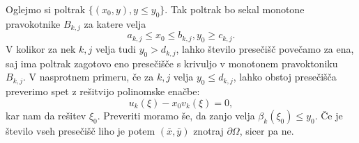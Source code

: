 \documentclass{article}
\begin{document}
Oglejmo si poltrak $\{(x_0,y) , y \leq y_0\}$. Tak poltrak bo sekal monotone pravokotnike $B_{k,j}$ za katere velja 
\begin{equation}
a_{k,j} \leq x_0 \leq b_{k,j} , y_0 \geq c_{k,j}.
\end{equation}
V kolikor za nek $k,j$ velja tudi $y_0 > d_{k,j}$, lahko število presečišč povečamo za ena, saj ima poltrak zagotovo eno presečišče s krivuljo v monotonem pravoktoniku $B_{k,j}$.
V nasprotnem primeru, če za $k,j$ velja $y_0 \leq d_{k,j}$, lahko obstoj presečišča preverimo spet z rešitvijo polinomske enačbe:
\begin{equation}
u_k (\xi) - x_0 v_k (\xi) = 0,
\end{equation}
kar nam da rešitev $\xi_0$. Preveriti moramo še, da zanjo velja $\beta_{k}(\xi_0) \leq y_0$. 
Če je število vseh presečišč liho je potem $(\bar{x},\bar{y})$ znotraj $\partial \Omega$, sicer pa ne.
\end{document}
